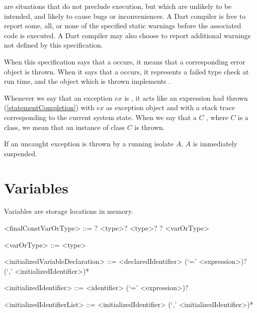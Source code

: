 \documentclass[makeidx]{article}
\begin{document}

\LMHash{}%
are situations that do not preclude execution,
but which are unlikely to be intended,
and likely to cause bugs or inconveniences.
A Dart compiler is free to report some, all,
or none of the specified static warnings before the associated code is executed.
A Dart compiler may also choose to report additional warnings
not defined by this specification.

\LMHash{}%
When this specification says that a  occurs,
it means that a corresponding error object is thrown.
When it says that a  occurs,
it represents a failed type check at run time,
and the object which is thrown implements .

\LMHash{}%
Whenever we say that an exception $ex$ is
,
it acts like an expression had thrown (\ref{statementCompletion})
with $ex$ as exception object and with a stack trace
corresponding to the current system state.
When we say that a $C$ ,
where $C$ is a class, we mean that an instance of class $C$ is thrown.

\LMHash{}%
If an uncaught exception is thrown by a running isolate $A$,
$A$ is immediately suspended.


\section{Variables}

\LMHash{}%
Variables are storage locations in memory.

\begin{grammar}
<finalConstVarOrType> ::= \LATE? \FINAL{} <type>?
  \alt \CONST{} <type>?
  \alt \LATE? <varOrType>

<varOrType> ::= \VAR{}
  \alt <type>

<initializedVariableDeclaration> ::= \gnewline{}
  <declaredIdentifier> (`=' <expression>)? (`,' <initializedIdentifier>)*

<initializedIdentifier> ::= <identifier> (`=' <expression>)?

<initializedIdentifierList> ::=
  <initializedIdentifier> (`,' <initializedIdentifier>)*
\end{grammar}
\end{document}
